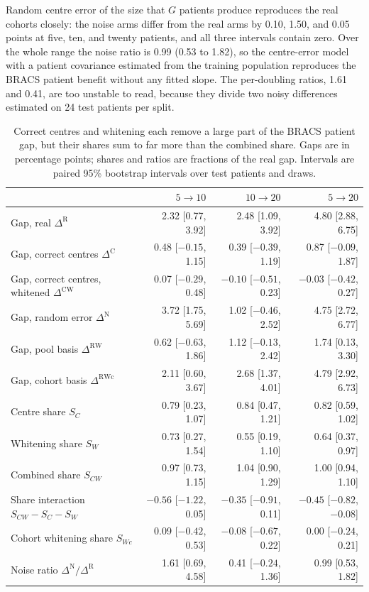 \documentclass[11pt]{article}
\begin{document}
Random centre error of the size that $G$ patients produce reproduces the real cohorts closely: the noise arms differ from the real arms by 0.10, 1.50, and 0.05 points at five, ten, and twenty patients, and all three intervals contain zero. Over the whole range the noise ratio is 0.99 (0.53 to 1.82), so the centre-error model with a patient covariance estimated from the training population reproduces the BRACS patient benefit without any fitted slope. The per-doubling ratios, 1.61 and 0.41, are too unstable to read, because they divide two noisy differences estimated on 24 test patients per split.

\begin{table}[htbp]
\centering
\small
\renewcommand{\arraystretch}{1.15}
\begin{tabular}{@{}lrrr@{}}
\toprule
 & $5\to10$ & $10\to20$ & $5\to20$ \\
\midrule
Gap, real $\Delta^{\mathrm R}$ & 2.32 [0.77, 3.92] & 2.48 [1.09, 3.92] & 4.80 [2.88, 6.75] \\
Gap, correct centres $\Delta^{\mathrm C}$ & 0.48 [$-0.15$, 1.15] & 0.39 [$-0.39$, 1.19] & 0.87 [$-0.09$, 1.87] \\
Gap, correct centres, whitened $\Delta^{\mathrm{CW}}$ & 0.07 [$-0.29$, 0.48] & $-0.10$ [$-0.51$, 0.23] & $-0.03$ [$-0.42$, 0.27] \\
Gap, random error $\Delta^{\mathrm N}$ & 3.72 [1.75, 5.69] & 1.02 [$-0.46$, 2.52] & 4.75 [2.72, 6.77] \\
Gap, pool basis $\Delta^{\mathrm{RW}}$ & 0.62 [$-0.63$, 1.86] & 1.12 [$-0.13$, 2.42] & 1.74 [0.13, 3.30] \\
Gap, cohort basis $\Delta^{\mathrm{RWc}}$ & 2.11 [0.60, 3.67] & 2.68 [1.37, 4.01] & 4.79 [2.92, 6.73] \\
\addlinespace
Centre share $S_C$ & 0.79 [0.23, 1.07] & 0.84 [0.47, 1.21] & 0.82 [0.59, 1.02] \\
Whitening share $S_W$ & 0.73 [0.27, 1.54] & 0.55 [0.19, 1.10] & 0.64 [0.37, 0.97] \\
Combined share $S_{CW}$ & 0.97 [0.73, 1.15] & 1.04 [0.90, 1.29] & 1.00 [0.94, 1.10] \\
Share interaction $S_{CW}-S_C-S_W$ & $-0.56$ [$-1.22$, 0.05] & $-0.35$ [$-0.91$, 0.11] & $-0.45$ [$-0.82$, $-0.08$] \\
Cohort whitening share $S_{Wc}$ & 0.09 [$-0.42$, 0.53] & $-0.08$ [$-0.67$, 0.22] & 0.00 [$-0.24$, 0.21] \\
Noise ratio $\Delta^{\mathrm N}/\Delta^{\mathrm R}$ & 1.61 [0.69, 4.58] & 0.41 [$-0.24$, 1.36] & 0.99 [0.53, 1.82] \\
\bottomrule
\end{tabular}
\caption{Correct centres and whitening each remove a large part of the BRACS patient gap, but their shares sum to far more than the combined share. Gaps are in percentage points; shares and ratios are fractions of the real gap. Intervals are paired 95\% bootstrap intervals over test patients and draws.}
\label{tab:shares}
\end{table}
\end{document}
